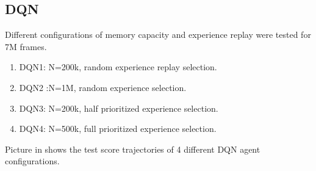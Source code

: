 \documentclass{article}
\begin{document}
\subsection{DQN}

Different configurations of memory capacity and experience replay were tested for 7M frames.
\begin{enumerate}
\item DQN1: N=200k, random experience replay selection.
\item DQN2 :N=1M, random experience selection.
\item DQN3: N=200k, half prioritized experience selection.
\item DQN4: N=500k, full prioritized experience selection.
\end{enumerate}
 Picture in  shows the test score trajectories of 4 different DQN agent configurations. 
\end{document}
